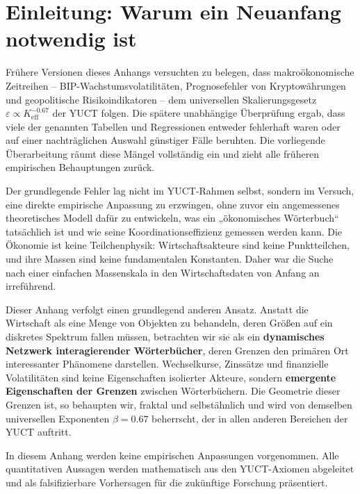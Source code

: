 \documentclass[12pt,a4paper]{article}
\theoremstyle{remark}
\begin{document}
	\tableofcontents
	\newpage
	
	\section{Einleitung: Warum ein Neuanfang notwendig ist}
	
	Frühere Versionen dieses Anhangs versuchten zu belegen, dass makroökonomische Zeitreihen – BIP-Wachstumsvolatilitäten, Prognosefehler von Kryptowährungen und geopolitische Risikoindikatoren – dem universellen Skalierungsgesetz \(\varepsilon \propto K_{\mathrm{eff}}^{-0.67}\) der YUCT folgen. Die spätere unabhängige Überprüfung ergab, dass viele der genannten Tabellen und Regressionen entweder fehlerhaft waren oder auf einer nachträglichen Auswahl günstiger Fälle beruhten. Die vorliegende Überarbeitung räumt diese Mängel vollständig ein und zieht alle früheren empirischen Behauptungen zurück.
	
	Der grundlegende Fehler lag nicht im YUCT-Rahmen selbst, sondern im Versuch, eine direkte empirische Anpassung zu erzwingen, ohne zuvor ein angemessenes theoretisches Modell dafür zu entwickeln, was ein „ökonomisches Wörterbuch“ tatsächlich ist und wie seine Koordinationseffizienz gemessen werden kann. Die Ökonomie ist keine Teilchenphysik: Wirtschaftsakteure sind keine Punktteilchen, und ihre Massen sind keine fundamentalen Konstanten. Daher war die Suche nach einer einfachen Massenskala in den Wirtschaftsdaten von Anfang an irreführend.
	
	Dieser Anhang verfolgt einen grundlegend anderen Ansatz. Anstatt die Wirtschaft als eine Menge von Objekten zu behandeln, deren Größen auf ein diskretes Spektrum fallen müssen, betrachten wir sie als ein \textbf{dynamisches Netzwerk interagierender Wörterbücher}, deren Grenzen den primären Ort interessanter Phänomene darstellen. Wechselkurse, Zinssätze und finanzielle Volatilitäten sind keine Eigenschaften isolierter Akteure, sondern \textbf{emergente Eigenschaften der Grenzen} zwischen Wörterbüchern. Die Geometrie dieser Grenzen ist, so behaupten wir, fraktal und selbstähnlich und wird von demselben universellen Exponenten \(\beta = 0.67\) beherrscht, der in allen anderen Bereichen der YUCT auftritt.
	
	In diesem Anhang werden keine empirischen Anpassungen vorgenommen. Alle quantitativen Aussagen werden mathematisch aus den YUCT-Axiomen abgeleitet und als falsifizierbare Vorhersagen für die zukünftige Forschung präsentiert.
	
\end{document}
